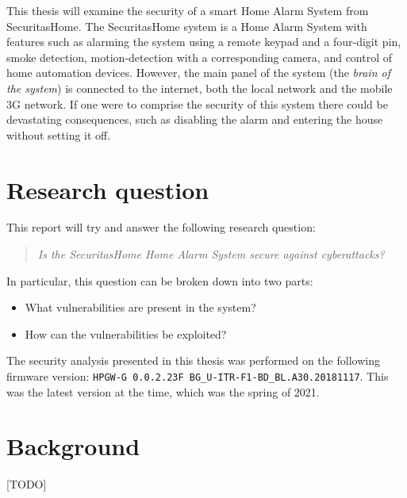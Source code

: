 This thesis will examine the security of a smart Home Alarm System from SecuritasHome. The SecuritasHome system is a Home Alarm System with features such as alarming the system using a remote keypad and a four-digit pin, smoke detection, motion-detection with a corresponding camera, and control of home automation devices. However, the main panel of the system (the \textit{brain of the system}) is connected to the internet, both the local network and the mobile 3G network. If one were to comprise the security of this system there could be devastating consequences, such as disabling the alarm and entering the house without setting it off.

\section{Research question} \label{ch:introduction:background}
This report will try and answer the following research question:

\begin{quote}
    \textit{Is the SecuritasHome Home Alarm System secure against cyberattacks?}
\end{quote}

\noindent In particular, this question can be broken down into two parts:

\begin{itemize}
    \item What vulnerabilities are present in the system?
    \item How can the vulnerabilities be exploited?
\end{itemize}

\noindent The security analysis presented in this thesis was performed on the following firmware version: \texttt{HPGW-G 0.0.2.23F BG\_U-ITR-F1-BD\_BL.A30.20181117}. This was the latest version at the time, which was the spring of 2021.

\section{Background} \label{ch:introduction:background}
[TODO]

